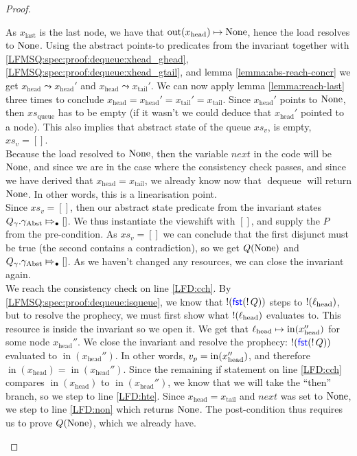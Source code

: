 \documentclass[a4paper, 10pt]{report}
\theoremstyle{definition}
\newcommand{\dequeue}{\operatorname{dequeue}}
\newcommand{\xsqueue}{xs_{\mathrm{queue}}}
\newcommand{\locN}[1]{\loc_{\mathrm{#1}}}
\newcommand{\lochead}{\locN{head}}
\newcommand{\nIn}[1]{\operatorname{in}(#1)}
\newcommand{\nOut}[1]{\operatorname{out}(#1)}
\newcommand{\node}{x}
\newcommand{\nodeN}[1]{\node_{\mathrm{#1}}}
\newcommand{\nodehead}{\nodeN{head}}
\newcommand{\nodetail}{\nodeN{tail}}
\newcommand{\nodelast}{\nodeN{last}}
\newcommand{\absvalueList}{xs_v}
\newcommand{\prophval}{\val_p}
\newcommand{\Qg}{Q_\gname}
\newcommand{\gabst}{\gname_{\mathrm{Abst}}}
\newcommand{\abstractstateauth}[2]{#1 \Mapsto_{\bullet} #2}
\newcommand{\reach}[2]{#1 \leadsto #2}
\begin{document}
\begin{proof}
\begin{itemize}
\begin{itemize}
      As $\nodelast$ is the last node, we have that $\nOut{\nodehead} \mapsto \None$, hence the load resolves to $\operatorname{None}$. Using the abstract points-to predicates from the invariant together with \ref{LFMSQ:spec:proof:dequeue:xhead_ghead}, \ref{LFMSQ:spec:proof:dequeue:xhead_gtail}, and lemma \ref{lemma:abs-reach-concr} we get $\reach{\nodehead}{\nodehead'}$ and $\reach{\nodehead}{\nodetail'}$. We can now apply lemma \ref{lemma:reach-last} three times to conclude $\nodehead = \nodehead' = \nodetail' = \nodetail$. Since $\nodehead'$ points to $\operatorname{None}$, then $\xsqueue$ has to be empty (if it wasn't we could deduce that $\nodehead'$ pointed to a node). This also implies that abstract state of the queue $\absvalueList$, is empty, $\absvalueList = []$.\\
      Because the load resolved to $\operatorname{None}$, then the variable $next$ in the code will be $\operatorname{None}$, and since we are in the case where the consistency check passes, and since we have derived that $\nodehead = \nodetail$, we already know now that $\dequeue$ will return $\operatorname{None}$. In other words, this is a linearisation point.\\
      Since $\absvalueList = []$, then our abstract state predicate from the invariant states $\abstractstateauth{\Qg.\gabst}{[]}$. We thus instantiate the viewshift with $[]$, and supply the $P$ from the pre-condition. As $\absvalueList = []$ we can conclude that the first disjunct must be true (the second contains a contradiction), so we get $Q(\operatorname{None})$ and $\abstractstateauth{\Qg.\gabst}{[]}$. As we haven't changed any resources, we can close the invariant again.\\
      We reach the consistency check on line \ref{LFD:cch}. By \ref{LFMSQ:spec:proof:dequeue:isqueue}, we know that $\mathop{!}(\operatorname{\textsf{\color{blue} fst}} (\mathop{!} Q))$ steps to $\deref(\lochead)$, but to resolve the prophecy, we must first show what $\deref(\lochead)$ evaluates to. This resource is inside the invariant so we open it. We get that $\lochead \mapsto \nIn{\nodehead''}$ for some node $\nodehead''$. We close the invariant and resolve the prophecy: $\mathop{!}(\operatorname{\textsf{\color{blue} fst}} (\mathop{!} Q))$ evaluated to $\nIn{\nodehead''}$. In other words, $\prophval = \nIn{\nodehead''}$, and therefore $\nIn{\nodehead} = \nIn{\nodehead''}$. Since the remaining if statement on line \ref{LFD:cch} compares $\nIn{\nodehead}$ to $\nIn{\nodehead''}$, we know that we will take the ``then'' branch, so we step to line \ref{LFD:hte}. Since $\nodehead = \nodetail$ and $next$ was set to $\operatorname{None}$, we step to line \ref{LFD:non} which returns $\operatorname{None}$. The post-condition thus requires us to prove $Q(\operatorname{None})$, which we already have.


\end{itemize}
\end{itemize}
\end{proof}
\end{document}
